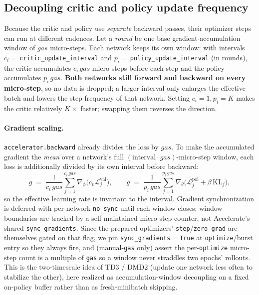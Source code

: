\documentclass[11pt]{article}
\theoremstyle{plain}
\theoremstyle{remark}
\begin{document}
\subsection{Decoupling critic and policy update frequency}
\label{sec:decouple}

Because the critic and policy use \emph{separate} backward passes, their optimizer
steps can run at different cadences. Let a \emph{round} be one base
gradient-accumulation window of $gas$ micro-steps. Each network keeps its own
window: with intervals $c_i=\,$\texttt{critic\_update\_interval} and
$p_i=\,$\texttt{policy\_update\_interval} (in rounds), the critic accumulates
$c_i\,gas$ micro-steps before each step and the policy accumulates $p_i\,gas$.
\textbf{Both networks still forward and backward on every micro-step}, so no data
is dropped; a larger interval only enlarges the effective batch and lowers the step
frequency of that network. Setting $c_i{=}1,p_i{=}K$ makes the critic relatively
$K\times$ faster; swapping them reverses the direction.

\paragraph{Gradient scaling.} \texttt{accelerator.backward} already divides the loss
by $gas$. To make the accumulated gradient the \emph{mean} over a network's full
$(\text{interval}\cdot gas)$-micro-step window, each loss is additionally divided by
its own interval before backward:
\begin{equation}
g \;=\; \frac{1}{c_i\,gas}\sum_{j=1}^{c_i\,gas}\nabla_\phi\big(c_v\mathcal{L}^{\text{val}}_j\big),
\qquad
g \;=\; \frac{1}{p_i\,gas}\sum_{j=1}^{p_i\,gas}\nabla_\theta\big(\mathcal{L}^{\text{pol}}_j{+}\beta\,\mathrm{KL}_j\big),
\end{equation}
so the effective learning rate is invariant to the interval. Gradient
synchronization is deferred with per-network \texttt{no\_sync} until each window
closes; window boundaries are tracked by a self-maintained micro-step counter, not
Accelerate's shared \texttt{sync\_gradients}. Since the prepared optimizers'
\texttt{step}/\texttt{zero\_grad} are themselves gated on that flag, we pin
\texttt{sync\_gradients}${=}$\texttt{True} at \texttt{optimize}/burst entry so they always
fire, and (manual-\texttt{gas} only) assert the per-\texttt{optimize} micro-step count is a
multiple of \texttt{gas} so a window never straddles two epochs' rollouts. This is the two-timescale idea of TD3 / DMD2 (update one network less
often to stabilize the other), here realized as accumulation-window decoupling on a
fixed on-policy buffer rather than as fresh-minibatch skipping.
\end{document}
